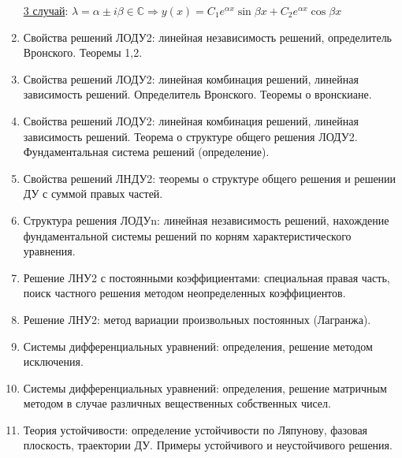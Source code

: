 \documentclass[12pt]{article}
\begin{document}
\begin{enumerate}
        \hyperlink{ldesgcomplexsolutions}{3 случай}: $\lambda = \alpha \pm i \beta \in \mathbb{C} \Longrightarrow y(x) = C_1 e^{\alpha x} \sin \beta x + C_2 e^{\alpha x} \cos \beta x$


        \item Свойства решений ЛОДУ2: линейная независимость решений, определитель Вронского. Теоремы 1,2.


        \item Свойства решений ЛОДУ2: линейная комбинация решений, линейная зависимость решений. Определитель Вронского. Теоремы о вронскиане.


        \item Свойства решений ЛОДУ2: линейная комбинация решений, линейная зависимость решений. Теорема о структуре общего решения ЛОДУ2. Фундаментальная система решений (определение).


        \item Свойства решений ЛНДУ2: теоремы о структуре общего решения и решении ДУ с суммой правых частей.


        \item Структура решения ЛОДУn: линейная независимость решений, нахождение фундаментальной системы решений по корням характеристического уравнения.


        \item Решение ЛНУ2 с постоянными коэффициентами: специальная правая часть, поиск частного решения методом неопределенных коэффициентов.


        \item Решение ЛНУ2: метод вариации произвольных постоянных (Лагранжа).


        \item Системы дифференциальных уравнений: определения, решение методом исключения.


        \item Системы дифференциальных уравнений: определения, решение матричным методом в случае различных вещественных собственных чисел.


        \item Теория устойчивости: определение устойчивости по Ляпунову, фазовая плоскость, траектории ДУ. Примеры устойчивого и неустойчивого решения.


    \end{enumerate}
\end{document}
